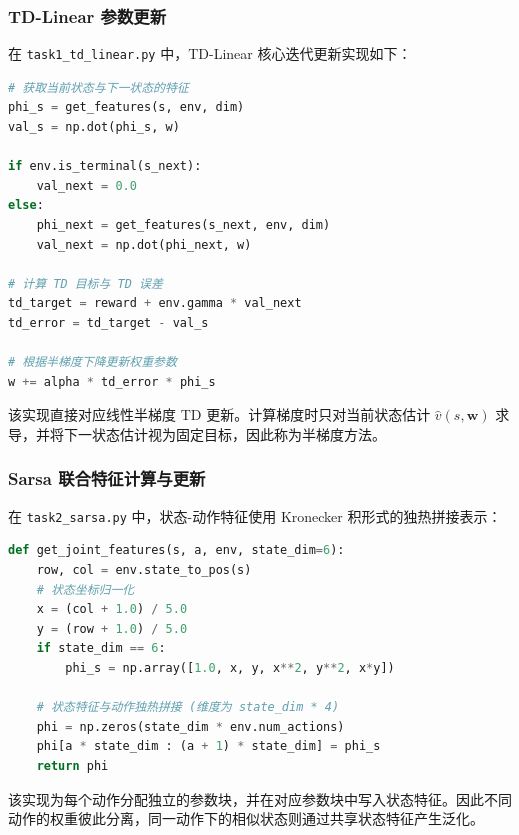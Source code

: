 \documentclass[11pt,a4paper,UTF8]{ctexart}
\numberwithin{figure}{section}
\numberwithin{table}{section}
\begin{document}
\subsubsection{TD-Linear 参数更新}
在 \texttt{task1\_td\_linear.py} 中，TD-Linear 核心迭代更新实现如下：
\begin{lstlisting}[language=python]
# 获取当前状态与下一状态的特征
phi_s = get_features(s, env, dim)
val_s = np.dot(phi_s, w)

if env.is_terminal(s_next):
    val_next = 0.0
else:
    phi_next = get_features(s_next, env, dim)
    val_next = np.dot(phi_next, w)

# 计算 TD 目标与 TD 误差
td_target = reward + env.gamma * val_next
td_error = td_target - val_s

# 根据半梯度下降更新权重参数
w += alpha * td_error * phi_s
\end{lstlisting}

该实现直接对应线性半梯度 TD 更新。计算梯度时只对当前状态估计 $\hat v(s,\mathbf w)$ 求导，并将下一状态估计视为固定目标，因此称为半梯度方法。

\subsubsection{Sarsa 联合特征计算与更新}
在 \texttt{task2\_sarsa.py} 中，状态-动作特征使用 Kronecker 积形式的独热拼接表示：
\begin{lstlisting}[language=python]
def get_joint_features(s, a, env, state_dim=6):
    row, col = env.state_to_pos(s)
    # 状态坐标归一化
    x = (col + 1.0) / 5.0
    y = (row + 1.0) / 5.0
    if state_dim == 6:
        phi_s = np.array([1.0, x, y, x**2, y**2, x*y])
    
    # 状态特征与动作独热拼接 (维度为 state_dim * 4)
    phi = np.zeros(state_dim * env.num_actions)
    phi[a * state_dim : (a + 1) * state_dim] = phi_s
    return phi
\end{lstlisting}

该实现为每个动作分配独立的参数块，并在对应参数块中写入状态特征。因此不同动作的权重彼此分离，同一动作下的相似状态则通过共享状态特征产生泛化。
\end{document}
